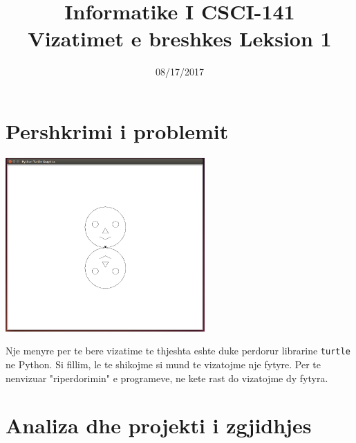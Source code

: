 \documentclass[pdftex,12pt]{artikel3}
\title{Informatike I \hfill CSCI-141\\
Vizatimet e breshkes \hfill Leksion 1}
\author{} %
\date{}   %
\begin{document}
\vspace{-27mm}
\maketitle

\vspace{-27mm}
\begin{tiny}
\hfill \date{08/17/2017}
\end{tiny}
\vspace{-6mm}

\section{Pershkrimi i problemit}

\begin{center}
\includegraphics[width=3.0in]{Faces.png} 
\end{center}

Nje menyre per te bere vizatime te thjeshta eshte duke perdorur librarine \texttt{turtle} ne Python. Si fillim, le 
te shikojme si mund te vizatojme nje fytyre. Per te nenvizuar "riperdorimin" e programeve, ne kete rast do vizatojme dy fytyra.


\section{Analiza dhe projekti i zgjidhjes}
\end{document}

